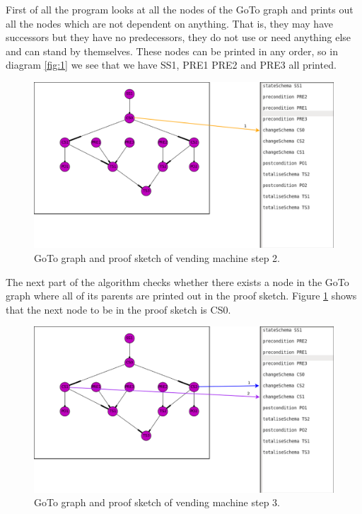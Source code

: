 First of all the program looks at all the nodes of the GoTo graph and prints out
all the nodes which are not dependent on anything. That is, they may have
successors but they have no predecessors, they do not use or need anything else
and can stand by themselves. These nodes can be printed in any order, so in
diagram \ref{fig:1} we see that we have SS1, PRE1 PRE2 and PRE3 all printed.

\begin{figure}[H]
\includegraphics[scale=0.3]{Figures/skeleton/2.png}
\caption{GoTo graph and proof sketch of vending machine step 2.}
\label{fig:2}
\end{figure}

The next part of the algorithm checks whether there exists a node in the GoTo
graph where all of its parents are printed out in the proof sketch. Figure
\ref{fig:2} shows that the next node to be in the proof sketch is CS0. 

\begin{figure}[H]
\includegraphics[scale=0.3]{Figures/skeleton/3.png}
\caption{GoTo graph and proof sketch of vending machine step 3.}
\label{fig:3}
\end{figure}

